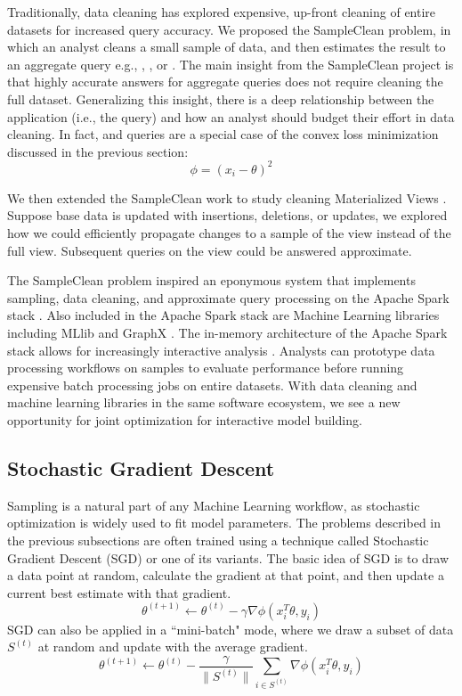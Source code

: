 Traditionally, data cleaning has explored expensive, up-front cleaning of entire datasets for increased query accuracy.
We proposed the SampleClean problem, in which an analyst cleans a small sample of data, and then estimates the result to an aggregate query e.g., \sumfunc, \countfunc, or \avgfunc.
The main insight from the SampleClean project is that highly accurate answers for aggregate queries does not require cleaning the full dataset.
Generalizing this insight, there is a deep relationship between the application (i.e., the query) and how an analyst should budget their effort in data cleaning.
In fact, \avgfunc and \sumfunc queries are a special case of the convex loss minimization discussed in the previous section:
\[
\phi = (x_{i} - \theta)^2
\]

We then extended the SampleClean work to study cleaning Materialized Views \cite{technicalReport}.
Suppose base data is updated with insertions, deletions, or updates, we explored how we could efficiently propagate
changes to a sample of the view instead of the full view.
Subsequent queries on the view could be answered approximate.

The SampleClean problem inspired an eponymous system that implements sampling, data cleaning, and approximate query processing on the Apache Spark stack \cite{sampleclean}.
Also included in the Apache Spark stack are Machine Learning libraries including MLlib \cite{mllib} and GraphX \cite{graphx}.
The in-memory architecture of the Apache Spark stack allows for increasingly interactive analysis \cite{AgarwalMPMMS13, armbrust2015spark}.
Analysts can prototype data processing workflows on samples to evaluate performance before running expensive batch processing jobs on entire datasets.
With data cleaning and machine learning libraries in the same software ecosystem, we see a new opportunity for joint optimization for interactive model building.



\subsection{Stochastic Gradient Descent}
Sampling is a natural part of any Machine Learning workflow, as stochastic optimization is widely used to fit model parameters.
The problems described in the previous subsections are often trained using a technique called Stochastic Gradient Descent (SGD) or one of its variants.
The basic idea of SGD is to draw a data point at random, calculate the gradient at that point, and then update a current best estimate with that gradient.
\[
\theta^{(t+1)}\leftarrow\theta^{(t)}-\gamma\nabla\phi(x_{i}^T\theta,y_{i})
\]
 SGD can also be applied in a ``mini-batch" mode, where we draw a subset of data $S^{(t)}$ at random and update with the average gradient.
 \[
 \theta^{(t+1)}\leftarrow\theta^{(t)}-\frac{\gamma}{\|S^{(t)}\|}\sum_{i\in S^{(t)}}\nabla\phi(x_{i}^T\theta,y_{i})
 \]

